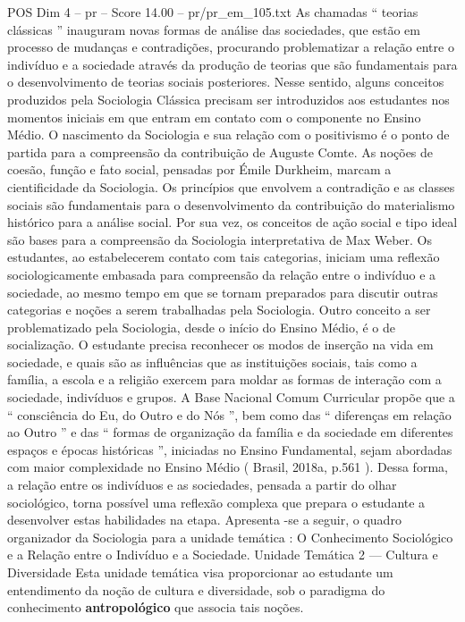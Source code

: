 \begin{textsample}{POS Dim 4 – pr – Score 14.00 – pr/pr\_em\_105.txt}
As chamadas “ teorias clássicas ” inauguram novas formas de análise das sociedades, que estão em processo de mudanças e contradições, procurando problematizar a relação entre o indivíduo e a sociedade através da produção de teorias que são fundamentais para o desenvolvimento de teorias sociais posteriores.
Nesse sentido, alguns conceitos produzidos pela Sociologia Clássica precisam ser introduzidos aos estudantes nos momentos iniciais em que entram em contato com o componente no Ensino Médio.
O nascimento da Sociologia e sua relação com o positivismo é o ponto de partida para a compreensão da contribuição de Auguste Comte.
As noções de coesão, função e fato social, pensadas por Émile Durkheim, marcam a cientificidade da Sociologia.
Os princípios que envolvem a contradição e as classes sociais são fundamentais para o desenvolvimento da contribuição do materialismo histórico para a análise social.
Por sua vez, os conceitos de ação social e tipo ideal são bases para a compreensão da Sociologia interpretativa de Max Weber.
Os estudantes, ao estabelecerem contato com tais categorias, iniciam uma reflexão sociologicamente embasada para compreensão da relação entre o indivíduo e a sociedade, ao mesmo tempo em que se tornam preparados para discutir outras categorias e noções a serem trabalhadas pela Sociologia.
Outro conceito a ser problematizado pela Sociologia, desde o início do Ensino Médio, é o de socialização.
O estudante precisa reconhecer os modos de inserção na vida em sociedade, e quais são as influências que as instituições sociais, tais como a família, a escola e a religião exercem para moldar as formas de interação com a sociedade, indivíduos e grupos.
A Base Nacional Comum Curricular propõe que a “ consciência do Eu, do Outro e do Nós ”, bem como das “ diferenças em relação ao Outro ” e das “ formas de organização da família e da sociedade em diferentes espaços e épocas históricas ”, iniciadas no Ensino Fundamental, sejam abordadas com maior complexidade no Ensino Médio ( Brasil, 2018a, p.561 ).
Dessa forma, a relação entre os indivíduos e as sociedades, pensada a partir do olhar sociológico, torna possível uma reflexão complexa que prepara o estudante a desenvolver estas habilidades na etapa.
Apresenta -se a seguir, o quadro organizador da Sociologia para a unidade temática : O Conhecimento Sociológico e a Relação entre o Indivíduo e a Sociedade.
Unidade Temática 2 — Cultura e Diversidade Esta unidade temática visa proporcionar ao estudante um entendimento da noção de cultura e diversidade, sob o paradigma do conhecimento \textbf{antropológico} que associa tais noções.

\end{textsample}

